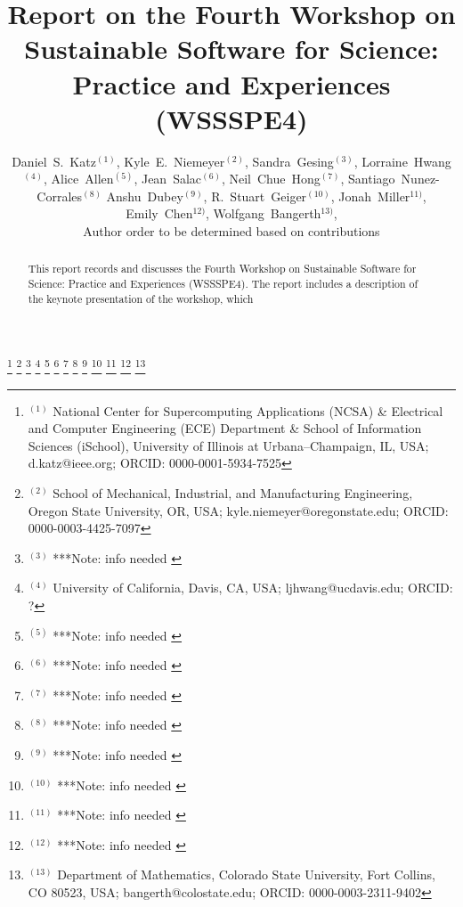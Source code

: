 \documentclass[11pt, oneside]{amsart}
\newcommand{\note}[1]{ {\textcolor{blueish}    { ***Note:      #1 }}}
\begin{document}
\title[]{Report on the Fourth Workshop on Sustainable Software for Science: Practice and Experiences (WSSSPE4)}

\author{Daniel~S.~Katz$^{(1)}$,
Kyle~E.~Niemeyer$^{(2)}$,
Sandra~Gesing$^{(3)}$,
Lorraine~Hwang$^{(4)}$,
Alice~Allen$^{(5)}$,
Jean~Salac$^{(6)}$,
Neil~Chue~Hong$^{(7)}$,
Santiago~Nunez-Corrales$^{(8)}$
Anshu~Dubey$^{(9)}$,
R.~Stuart~Geiger$^(10)$,
Jonah~Miller$^{11)}$,
Emily~Chen$^{12)}$,
Wolfgang~Bangerth$^{13)}$,
\\Author order to be determined based on contributions
}

%
\thanks{{}$^{(1)}$ \hspace{-1ex}National Center for Supercomputing Applications (NCSA) \&
Electrical and Computer Engineering (ECE) Department \&
School of Information Sciences (iSchool),
University of Illinois at Urbana--Champaign, IL, USA; d.katz@ieee.org; ORCID: 0000-0001-5934-7525}
%
\thanks{{}$^{(2)}$ School of Mechanical, Industrial, and Manufacturing Engineering,
Oregon State University, OR, USA; kyle.niemeyer@oregonstate.edu; ORCID: 0000-0003-4425-7097}
%
\thanks{{}$^{(3)}$ \note{info needed}}
%
\thanks{{}$^{(4)}$ University of California, Davis, CA, USA; ljhwang@ucdavis.edu; ORCID: ?}
%
\thanks{{}$^{(5)}$ \note{info needed}}
%
\thanks{{}$^{(6)}$ \note{info needed}}
%
\thanks{{}$^{(7)}$ \note{info needed}}
%
\thanks{{}$^{(8)}$ \note{info needed}}
%
\thanks{{}$^{(9)}$ \note{info needed}}
%
\thanks{{}$^{(10)}$ \note{info needed}}
%
\thanks{{}$^{(11)}$ \note{info needed}}
%
\thanks{{}$^{(12)}$ \note{info needed}}
%
\thanks{{}$^{(13)}$ Department of Mathematics, Colorado State
  University, Fort Collins, CO 80523, USA; bangerth@colostate.edu; ORCID: 0000-0003-2311-9402}


\begin{abstract}
This report records and discusses the Fourth Workshop on Sustainable
Software for Science: Practice and Experiences (WSSSPE4). The report
includes a description of the keynote presentation of the workshop,
which %

\end{abstract}
\end{document}
